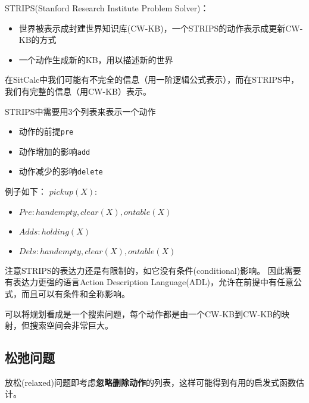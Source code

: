 STRIPS(Stanford Research Institute Problem Solver)：
\begin{itemize}
	\item 世界被表示成封建世界知识库(CW-KB)，一个STRIPS的动作表示成更新CW-KB的方式
	\item 一个动作生成新的KB，用以描述新的世界
\end{itemize}

在SitCalc中我们可能有不完全的信息（用一阶逻辑公式表示），而在STRIPS中，我们有完整的信息（用CW-KB）表示。

STRIPS中需要用3个列表来表示一个动作
\begin{itemize}
	\item 动作的前提\verb'pre'
	\item 动作增加的影响\verb'add'
	\item 动作减少的影响\verb'delete'
\end{itemize}

例子如下：
$pickup(X)$:
\begin{itemize}
\item $Pre: {handempty, clear(X), ontable(X)}$
\item $Adds: {holding(X)}$
\item $Dels: {handempty, clear(X), ontable(X)}$
\end{itemize}

\myhline
注意STRIPS的表达力还是有限制的，如它没有条件(conditional)影响。
因此需要有表达力更强的语言Action Description Language(ADL)，允许在前提中有任意公式，而且可以有条件和全称影响。

可以将规划看成是一个搜索问题，每个动作都是由一个CW-KB到CW-KB的映射，但搜索空间会非常巨大。

\subsection{松弛问题}
放松(relaxed)问题即考虑\textbf{忽略删除动作}的列表，这样可能得到有用的启发式函数估计。

